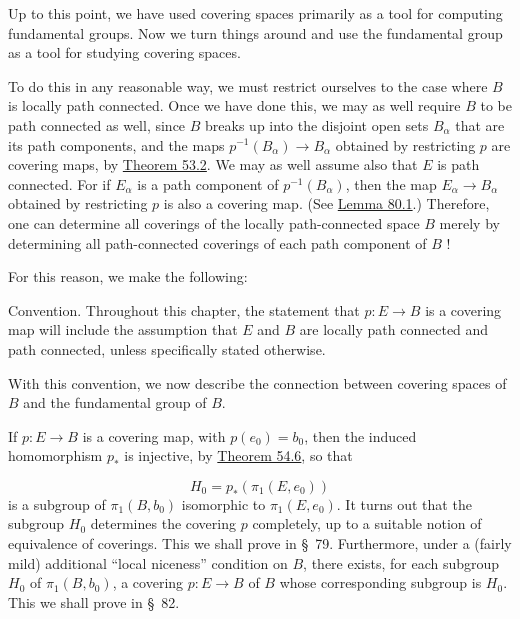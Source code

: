 
Up to this point, we have used covering spaces primarily as a tool for computing fundamental groups. Now we turn things around and use the fundamental group as a tool for studying covering spaces.

To do this in any reasonable way, we must restrict ourselves to the case where \(B\) is locally path connected. Once we have done this, we may as well require \(B\) to be path connected as well, since \(B\) breaks up into the disjoint open sets \(B_{\alpha }\) that are its path components, and the maps \(p^{-1}( B_{\alpha }) \rightarrow {B}_{\alpha }\) obtained by restricting \(p\) are covering maps, by \hyperref[thm:53.2]{Theorem 53.2}. We may as well assume also that \(E\) is path connected. For if \(E_{\alpha }\) is a path component of \(p^{-1}( B_{\alpha })\), then the map \(E_{\alpha } \rightarrow {B}_{\alpha }\) obtained by restricting \(p\) is also a covering map. (See \hyperref[lem:80.1]{Lemma 80.1}.) Therefore, one can determine all coverings of the locally path-connected space \(B\) merely by determining all path-connected coverings of each path component of \(B\) !

For this reason, we make the following:

Convention. Throughout this chapter, the statement that \(p : E \rightarrow B\) is a covering map will include the assumption that \(E\) and \(B\) are locally path connected and path connected, unless specifically stated otherwise.

With this convention, we now describe the connection between covering spaces of \(B\) and the fundamental group of \(B\).

If \(p : E \rightarrow B\) is a covering map, with \(p( e_{0}) = b_{0}\), then the induced homomorphism \(p_{ * }\) is injective, by \hyperref[thm:54.6]{Theorem 54.6}, so that

\[
H_{0} = p_{ * }( {{\pi }_{1}( {E,e_{0}}) })
\]
is a subgroup of \({\pi }_{1}( {B,b_{0}})\) isomorphic to \({\pi }_{1}( {E,e_{0}})\). It turns out that the subgroup \(H_{0}\) determines the covering \(p\) completely, up to a suitable notion of equivalence of coverings. This we shall prove in \S\ 79. Furthermore, under a (fairly mild) additional ``local niceness'' condition on \(B\), there exists, for each subgroup \(H_{0}\) of \({\pi }_{1}( {B,b_{0}})\), a covering \(p : E \rightarrow B\) of \(B\) whose corresponding subgroup is \(H_{0}\). This we shall prove in \S\ 82.

